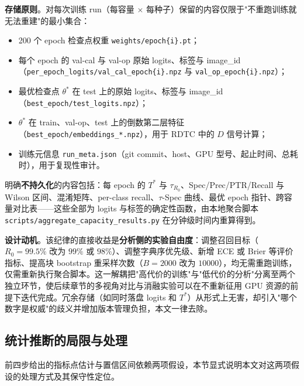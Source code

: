 \documentclass[UTF8,openany,12pt]{ctexbook}
\begin{document}
\textbf{存储原则}。对每次训练 run（每容量 $\times$ 每种子）保留的内容仅限于"不重跑训练就无法重建"的最小集合：

\begin{itemize}[leftmargin=2em,nosep]
\item 200 个 epoch 检查点权重 \texttt{weights/epoch\{i\}.pt}；
\item 每个 epoch 的 val-cal 与 val-op 原始 logits、标签与 image\_id（\texttt{per\_epoch\_logits/val\_cal\_epoch\{i\}.npz} 与 \texttt{val\_op\_epoch\{i\}.npz}）；
\item 最优检查点 $\theta^{\ast}$ 在 test 上的原始 logits、标签与 image\_id（\texttt{best\_epoch/test\_logits.npz}）；
\item $\theta^{\ast}$ 在 train、val-op、test 上的倒数第二层特征（\texttt{best\_epoch/embeddings\_*.npz}），用于 RDTC 中的 $D$ 信号计算；
\item 训练元信息 \texttt{run\_meta.json}（git commit、host、GPU 型号、起止时间、总耗时），用于复现性审计。
\end{itemize}

明确\textbf{不持久化}的内容包括：每 epoch 的 $T^{\ast}$ 与 $\tau_{R_0}$、Spec/Prec/PTR/Recall 与 Wilson 区间、混淆矩阵、per-class recall、$\tau$-Spec 曲线、最优 epoch 指针、跨容量对比表——这些全部为 logits 与标签的确定性函数，由本地聚合脚本 \texttt{scripts/aggregate\_capacity\_results.py} 在分钟级时间内重算得到。

\textbf{设计动机}。该纪律的直接收益是\textbf{分析侧的实验自由度}：调整召回目标（$R_0 = 99.5\%$ 改为 $99\%$ 或 $98\%$）、调整字典序优先级、新增 ECE 或 Brier 等评价指标、提高块 bootstrap 重采样次数（$B = 2000$ 改为 $10000$），均无需重跑训练，仅需重新执行聚合脚本。这一解耦把"高代价的训练"与"低代价的分析"分离至两个独立环节，使后续章节的多视角对比与消融实验可以在不重新征用 GPU 资源的前提下迭代完成。冗余存储（如同时落盘 logits 和 $T^{\ast}$）从形式上无害，却引入"哪个数字是权威"的歧义并增加版本管理负担，本文一律去除。

\subsection{统计推断的局限与处理}
\label{sec:stat-limitations}
前四步给出的指标点估计与置信区间依赖两项假设，本节显式说明本文对这两项假设的处理方式及其保守性定位。
\end{document}
